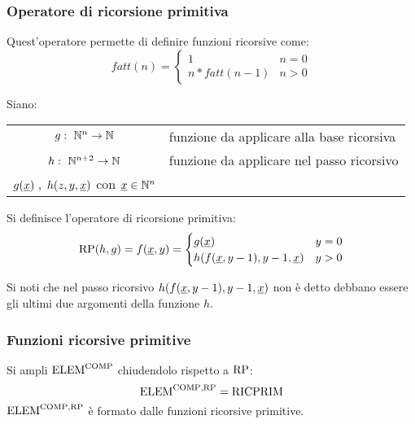 \subsubsection*{Operatore di ricorsione primitiva}
Quest'operatore permette di definire funzioni ricorsive come:
$$ fatt(n) = \begin{cases}
    1 & n=0\\
    n*fatt(n-1) & n>0
\end{cases} $$

Siano:
\begin{center}
    \begin{tabular}{c l}
        $g:\ \N^n\to\N$ & funzione da applicare alla base ricorsiva\\
        $h:\ \N^{n+2}\to\N$ & funzione da applicare nel passo ricorsivo\\
        $g(\text{\underline{$x$}})\ ,\ h(z,y,\text{\underline{$x$}})$ con $\text{\underline{$x$}}\in\mathbb{N}^n$\\
    \end{tabular}
\end{center}

Si definisce l'operatore di ricorsione primitiva:
$$ \text{RP}(h,g) = f(\text{\underline{$x$}},y) = \begin{cases}
    g(\text{\underline{$x$}}) & y=0\\
    h(f(\text{\underline{$x$}},y-1),y-1,\text{\underline{$x$}}) & y>0
\end{cases}$$

Si noti che nel passo ricorsivo $h(f(\text{\underline{$x$}},y-1),y-1,\text{\underline{$x$}})$ non è detto
debbano essere gli ultimi due argomenti della funzione $h$.

\subsubsection{Funzioni ricorsive primitive}
Si ampli $\text{ELEM}^{\text{COMP}}$ chiudendolo rispetto a $\text{RP}$:
$$ \text{ELEM}^{\text{COMP},\text{RP}} = \text{RICPRIM} $$
$\text{ELEM}^{\text{COMP},\text{RP}}$ è formato dalle funzioni ricorsive primitive.

